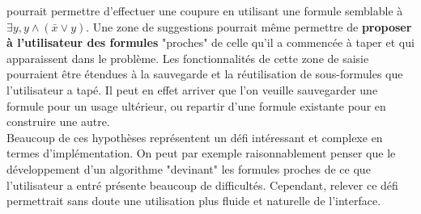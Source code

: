 pourrait permettre d'effectuer une coupure en utilisant une formule semblable à $\exists y, y \wedge (\bar{x} \vee y)$. Une zone de suggestions pourrait même permettre de \textbf{proposer à l'utilisateur des formules} "proches" de celle qu'il a commencée à taper et qui apparaissent dans le problème. Les fonctionnalités de cette zone de saisie pourraient être étendues à la sauvegarde et la réutilisation de sous-formules que l'utilisateur a tapé. Il peut en effet arriver que l'on veuille sauvegarder une formule pour un usage ultérieur, ou repartir d'une formule existante pour en construire une autre.\\

Beaucoup de ces hypothèses représentent un défi intéressant et complexe en termes d'implémentation. On peut par exemple raisonnablement penser que le développement d'un algorithme "devinant" les formules proches de ce que l'utilisateur a entré présente beaucoup de difficultés. Cependant, relever ce défi permettrait sans doute une utilisation plus fluide et naturelle de l'interface.